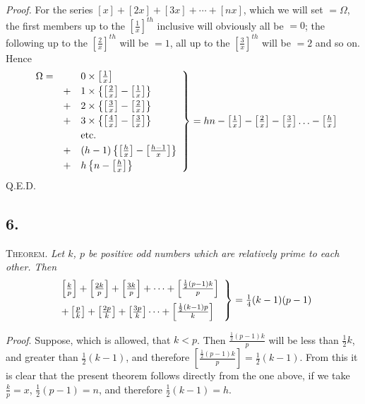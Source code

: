 \documentclass[14pt]{memoir}
\theoremstyle{plain}
\theoremstyle{remark}
\begin{document}
\textit{Proof.} For the series $[x] + [2x] + [3x] + \cdots + [nx]$, which we will set $= \Omega$, the first members up to the $\left[\tfrac{1}{x}\right]^{th}$ inclusive will obviously all be $=0$; the following up to the $\left[\tfrac{2}{x}\right]^{th}$ will be $=1$, all up to the $[\tfrac{3}{x}]^{th}$ will be $=2$ and so on.  Hence 
\[ \left. \begin{array}{rrl} \Omega = & &0 \times \left[\tfrac{1}{x}\right] \vspace{1mm} \\
& +& 1 \times \left\{ \left[\tfrac{2}{x}\right] - \left[\tfrac{1}{x}\right] \right\} \vspace{1mm} \\
& +& 2 \times \left\{ \left[\tfrac{3}{x}\right] - \left[\tfrac{2}{x}\right] \right\}\vspace{1mm}  \\
& +& 3 \times \left\{ \left[\tfrac{4}{x}\right] - \left[\tfrac{3}{x}\right] \right\}\vspace{1mm}  \\
&& \text{etc.}\vspace{1mm}  \\ 
& +& (h-1)  \left\{ \left[\tfrac{h}{x}\right] - \left[\tfrac{h-1}{x}\right] \right\} \vspace{1mm} \\
& +& h \left\{ n - \left[\tfrac{h}{x}\right] \right\} \end{array} \right\} = hn - \left[\tfrac{1}{x}\right] - \left[\tfrac{2}{x}\right]- \left[\tfrac{3}{x}\right] \ldots - \left[\tfrac{h}{x}\right] \]
Q.E.D.

\subsection*{6.}

\textsc{Theorem}. \textit{ Let $k$, $p$ be positive odd numbers which are relatively prime to each other.  Then 
\[ \left. \begin{array}{l} \left[\tfrac{k}{p}\right] + \left[\tfrac{2k}{p}\right] + \left[\tfrac{3k}{p}\right] + \cdots + \left[\tfrac{\frac{1}{2}(p-1)k}{p}\right] \vspace{2mm} \\
+ \left[\tfrac{p}{k}\right] + \left[\tfrac{2p}{k}\right] + \left[\tfrac{3p}{k}\right]  \cdots + \left[\tfrac{\frac{1}{2}(k-1)p}{k}\right] \end{array} \right\} = \tfrac{1}{4}(k-1)(p-1) \]}

\textit{Proof}. Suppose, which is allowed, that $k<p$.  Then $\tfrac{\frac{1}{2}(p-1)k}{p}$ will be less than $\tfrac{1}{2}k$, and greater than $\tfrac{1}{2}(k-1)$, and therefore $\left[\tfrac{ \frac{1}{2}(p-1)k}{p}\right] = \tfrac{1}{2}(k-1)$.  From this it is clear that the present theorem follows directly from the one above, if we take $\tfrac{k}{p} = x$, $\tfrac{1}{2}(p-1) = n$, and therefore $\tfrac{1}{2}(k-1) = h$. 
\end{document}
